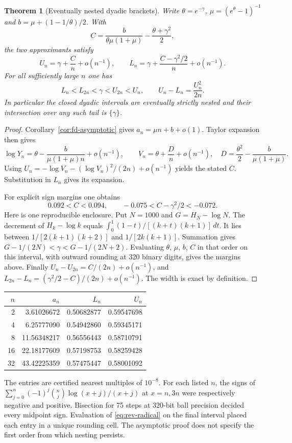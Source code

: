 \documentclass[11pt,a4paper]{article}
\newtheorem{theorem}{Theorem}[section]
\theoremstyle{definition}\newtheorem{definition}[theorem]{Definition}\newtheorem{example}[theorem]{Example}
\theoremstyle{remark}\newtheorem{remark}[theorem]{Remark}
\begin{document}
\begin{theorem}[Eventually nested dyadic brackets]\label{thm:rev-bracket}
Write $\theta=e^{-\gamma}$, $\mu=(e^\theta-1)^{-1}$ and $b=\mu+(1-1/\theta)/2$. With
\[
 C=\frac{b}{\theta\mu(1+\mu)}-\frac{\theta+\gamma^2}{2},
\]
the two approximants satisfy
\[
 U_n=\gamma+\frac{C}{n}+o(n^{-1}),\qquad
 L_n=\gamma+\frac{C-\gamma^2/2}{n}+o(n^{-1}).
\]
For all sufficiently large $n$ one has
\[
 L_n<L_{2n}<\gamma<U_{2n}<U_n,\qquad U_n-L_n=\frac{U_n^2}{2n}.
\]
In particular the closed dyadic intervals are eventually strictly nested and their intersection over any such tail is $\{\gamma\}$.
\end{theorem}
\begin{proof}
Corollary~\ref{cor:fd-asymptotic} gives $a_n=\mu n+b+o(1)$. Taylor expansion then gives
\[
 \log Y_n=\theta-\frac{b}{\mu(1+\mu)n}+o(n^{-1}),\qquad
 V_n=\theta+\frac{D}{n}+o(n^{-1}),\quad
 D=\frac{\theta^2}{2}-\frac{b}{\mu(1+\mu)}.
\]
Using $U_n=-\log V_n-(\log V_n)^2/(2n)+o(n^{-1})$ yields the stated $C$. Substitution in $L_n$ gives its expansion.

For explicit sign margins one obtains
\[
 0.092<C<0.094,\qquad -0.075<C-\gamma^2/2<-0.072.
\]
Here is one reproducible enclosure. Put $N=1000$ and $G=H_N-\log N$. The decrement of $H_k-\log k$ equals $\int_0^1(1-t)/[(k+t)(k+1)]\,dt$. It lies between $1/[2(k+1)(k+2)]$ and $1/[2k(k+1)]$. Summation gives $G-1/(2N)<\gamma<G-1/(2N+2)$. Evaluating $\theta$, $\mu$, $b$, $C$ in that order on this interval, with outward rounding at 320 binary digits, gives the margins above. Finally $U_n-U_{2n}=C/(2n)+o(n^{-1})$, and $L_{2n}-L_n=(\gamma^2/2-C)/(2n)+o(n^{-1})$. The width is exact by definition.
\end{proof}

\begin{center}
\begin{tabular}{r@{\qquad}r@{\qquad}r@{\qquad}r}
\toprule
$n$ & $a_n$ & $L_n$ & $U_n$\\
\midrule
2 & 3.61026672 & 0.50682877 & 0.59547698\\
4 & 6.25777090 & 0.54942860 & 0.59345171\\
8 & 11.56348217 & 0.56556443 & 0.58710791\\
16 & 22.18177609 & 0.57198753 & 0.58259428\\
32 & 43.42225359 & 0.57475447 & 0.58001092\\
\bottomrule
\end{tabular}
\end{center}
The entries are certified nearest multiples of $10^{-8}$. For each listed $n$, the signs of $\sum_{j=0}^n(-1)^j\binom nj\log(x+j)/(x+j)$ at $x=n,3n$ were respectively negative and positive. Bisection for 75 steps at 320-bit ball precision decided every midpoint sign. Evaluation of \eqref{eq:rev-radical} on the final interval placed each entry in a unique rounding cell. The asymptotic proof does not specify the first order from which nesting persists.
\end{document}
